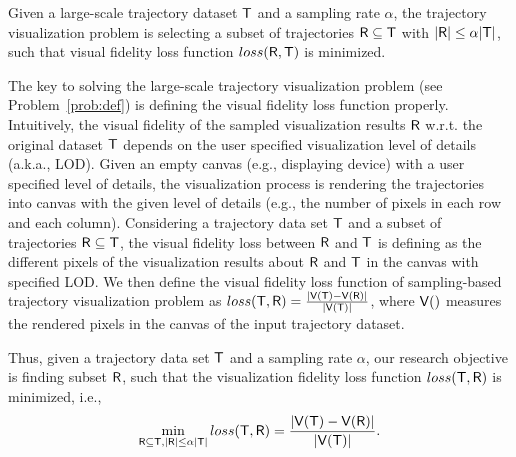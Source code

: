 \begin{problem}\label{prob:def}
Given a large-scale trajectory dataset $\mathsf{T}$ and a sampling rate $\alpha$,
the trajectory visualization problem is selecting a subset of trajectories $\mathsf{R} \subseteq \mathsf{T}$ with $|\mathsf{R}| \leq \alpha |\mathsf{T}|$,
such that visual fidelity loss function $loss(\mathsf{R},\mathsf{T})$ is minimized.
\end{problem}



The key to solving the large-scale trajectory visualization problem (see Problem~\ref{prob:def}) is defining the visual fidelity loss function properly.
Intuitively, the visual fidelity of the sampled visualization results $\mathsf{R}$ w.r.t. the original dataset $\mathsf{T}$ depends on the user specified visualization level of details (a.k.a., LOD).
Given an empty canvas (e.g., displaying device) with a user specified level of details,
the visualization process is rendering the trajectories into canvas with the given level of details (e.g., the number of pixels in each row and each column).
Considering a trajectory data set $\mathsf{T}$ and a subset of trajectories $\mathsf{R} \subseteq \mathsf{T}$,
the visual fidelity loss between $\mathsf{R}$ and $\mathsf{T}$ is defining as the different pixels of the visualization results about $\mathsf{R}$ and $\mathsf{T}$ in the canvas with specified LOD.
We then define the visual fidelity loss function of sampling-based trajectory visualization problem as $loss(\mathsf{T}, \mathsf{R}) = \frac{|\mathsf{V}(\mathsf{T}) - \mathsf{V}(\mathsf{R})|}{|\mathsf{V}(\mathsf{T})|}$,
where $\mathsf{V}()$ measures the rendered pixels in the canvas of the input trajectory dataset.

Thus, given a trajectory data set $\mathsf{T}$ and a sampling rate $\alpha$,
our research objective is finding subset $\mathsf{R}$, such that  the visualization fidelity loss function $loss(\mathsf{T}, \mathsf{R})$ is minimized,
i.e.,
$$ \min_{\mathsf{R} \subseteq \mathsf{T}, |\mathsf{R}| \leq \alpha |\mathsf{T}|}  loss(\mathsf{T}, \mathsf{R}) =  \frac{|\mathsf{V}(\mathsf{T}) - \mathsf{V}(\mathsf{R})|}{|\mathsf{V}(\mathsf{T})|}. $$ %



